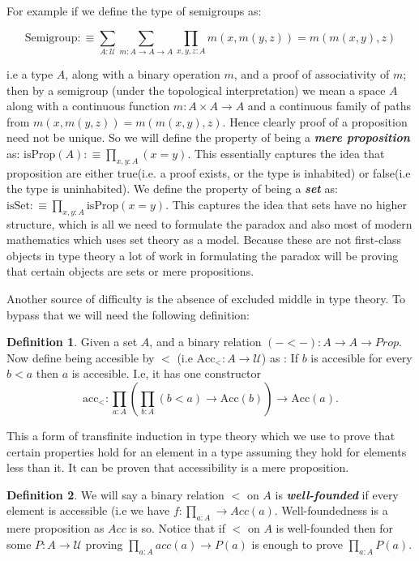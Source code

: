 \documentclass[10pt]{article}
\theoremstyle{definition}
\newtheorem{definition}{Definition}[section]
\theoremstyle{plain}
\theoremstyle{remark}
\newcommand{\U}{\mathscr{U}}
\begin{document}
For example if we define the type of semigroups as:

\[ \text{Semigroup}:\equiv 	\sum_{A : \U} \sum_{m : A \to A \to A} 
    \prod_{x,y,z:A} m(x,m(y,z)) = m(m(x,y),z) \]
    
i.e a type $A$, along with a binary operation $m$, and a proof of associativity of $m$; then
by a semigroup (under the topological interpretation) we mean a space $A$ along with a
continuous function $m : A\times A \to A$ and a continuous family of paths from 
$m(x,m(y,z)) = m(m(x,y),z)$. Hence clearly proof of a proposition need not be unique. So
we will define the property of being a \textbf{\textit{mere proposition}} as:
${ \text{isProp}(A) :\equiv \prod_{x,y : A} (x = y) }$. This essentially captures the idea
that proposition are either true(i.e. a proof exists, or the type is inhabited) or false(i.e
the type is uninhabited). We define the property of being a \textbf{\textit{set}} as: 
${ \text{isSet} :\equiv \prod_{x,y:A} \text{isProp}(x=y)  }$. This captures the idea that sets
have no higher structure, which is all we need to formulate the paradox and also most of
modern mathematics which uses set theory as a model. Because these are not first-class 
objects in type theory a lot of work in formulating the paradox will be proving that certain
objects are sets or mere propositions.\smallskip

Another source of difficulty is the absence of excluded middle in type theory. To bypass that
we will need the following definition:

\begin{definition}\label{D:Acc}
Given a set $A$, and a binary relation $(-<-) : A \to A \to Prop$. Now define being 
accesible by $<$ (i.e $\text{Acc}_{<} : A \to \U$) as : If $b$ is accesible for every $b<a$ 
then $a$ is accesible. I.e, it has one constructor 
\[ \text{acc}_< : \prod_{a : A} \left( \prod_{b : A} (b<a) \to \text{Acc}(b) \right) 
\to \text{Acc}(a). \]

\end{definition}
 
This a form of transfinite induction in type theory which we use to prove that certain
properties hold for an element in a type assuming they hold for elements less than it.
It can be proven that accessibility is a mere proposition. 

\begin{definition}\label{D:WF}
We will say a binary relation $<$ on $A$ is \textbf{\textit{well-founded}} if every element
is accessible (i.e we have $f : \prod_{a : A} \to Acc(a)$. Well-foundedness is a mere 
proposition as $Acc$ is so. Notice that if $<$ on $A$ is well-founded then for some 
$P : A \to \U$ proving $\prod_{a:A} acc(a) \to P(a)$ is enough to prove $\prod_{a : A} P(a)$.
\end{definition}
\end{document}
